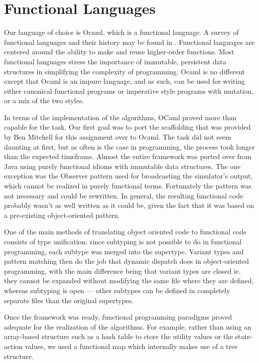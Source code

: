 \documentclass[12pt, letterpaper]{article}
\begin{document}
\section{Functional Languages}

Our language of choice is Ocaml, which is a functional language. A survey of functional languages and their history may be found in \cite{hudak1989conception}. Functional languages are centered around the ability to make and reuse higher-order functions. Most functional languages stress the importance of immutable, persistent data structures in simplifying the complexity of programming. Ocaml is no different except that Ocaml is an impure language, and as such, can be used for writing either canonical functional programs or imperative style programs with mutation, or a mix of the two styles.

In terms of the implementation of the algorithms, OCaml proved more than capable for the task. Our first goal was to port the scaffolding that was provided by Ben Mitchell for this assignment over to Ocaml. The task did not seem daunting at first, but as often is the case in programming, the process took longer than the expected timeframe. Almost the entire framework was ported over from Java using purely functional idioms with immutable data structures. The one exception was the Observer pattern used for broadcasting the simulator's output, which cannot be realized in purely functional terms. Fortunately the pattern was not necessary and could be rewritten. In general, the resulting functional code probably wasn't as well written as it could be, given the fact that it was based on a pre-existing object-oriented pattern.

One of the main methods of translating object oriented code to functional code consists of type unification: since subtyping is not possible to do in functional programming, each subtype was merged into the supertype. Variant types and pattern matching then do the job that dynamic dispatch does in object-oriented programming, with the main difference being that variant types are closed ie. they cannot be expanded without modifying the same file where they are defined, whereas subtyping is open --- other subtypes can be defined in completely separate files than the original supertypes.

Once the framework was ready, functional programming paradigms proved adequate for the realization of the algorithms. For example, rather than using an array-based structure such as a hash table to store the utility values or the state-action values, we used a functional map which internally makes use of a tree structure.
\end{document}
